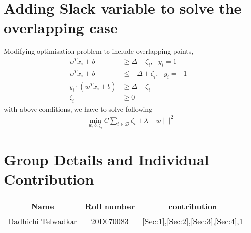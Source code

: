 \documentclass[11pt, twosides]{article}
\begin{document}
\section{Adding Slack variable to solve the overlapping case}
\label{Sec:5}
Modifying optimisation problem to include overlapping points,
\begin{align*}
    w^Tx_i + b &\ge \Delta - \zeta_i, \, \, \, \, y_i = 1\\
    w^Tx_i +b &\le -\Delta + \zeta_i,\, \, \, \, y_i = -1\\
        y_i \cdot \left(w^Tx_i + b \right) &\ge \Delta - \zeta_i \\
\zeta_i &\ge 0
\end{align*}
with above conditions, we have to solve following
\begin{align*}
    &\min_{w,b,\zeta_i} C\sum_{i \in \mathcal{D}} \zeta_i
 + \lambda \mid \mid w \mid \mid ^2 
 \end{align*}


\section{Group Details and Individual Contribution}
\begin{table}[H]
    \centering
    \begin{tabular}{|c|c|c|}
     \hline
        Name & Roll number & contribution \\
        \hline
        Dadhichi Telwadkar & 20D070083 & \ref{Sec:1},\ref{Sec:2},\ref{Sec:3},\ref{Sec:4},\ref{Sec:5}\\
    \hline
    \end{tabular}
    \label{tab:my_label}
\end{table}
\end{document}
